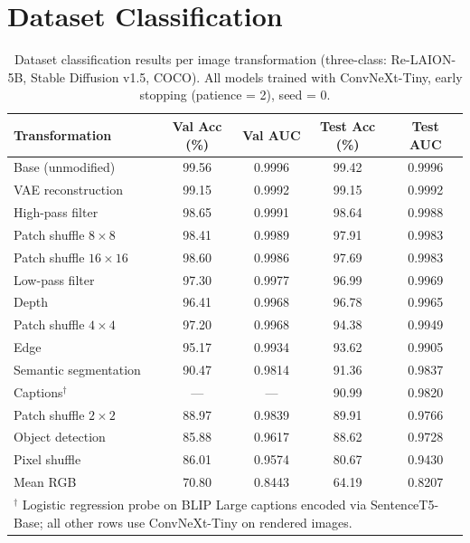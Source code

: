 \section{Dataset Classification}

\begin{table}[htbp]
	\centering
	\caption{Dataset classification results per image transformation (three-class:
		Re-LAION-5B, Stable Diffusion v1.5, COCO). All models trained with ConvNeXt-Tiny,
		early stopping (patience = 2), seed = 0.}
	\label{tab:dataset_classification_results}
	\small
	\begin{tabular}{p{4cm}cccc}
		\toprule
		\textbf{Transformation} &
		\textbf{Val Acc (\%)} & \textbf{Val AUC} &
		\textbf{Test Acc (\%)} & \textbf{Test AUC} \\
		\midrule
		Base (unmodified)          & 99.56 & 0.9996 & 99.42 & 0.9996 \\
		VAE reconstruction         & 99.15 & 0.9992 & 99.15 & 0.9992 \\
		High-pass filter           & 98.65 & 0.9991 & 98.64 & 0.9988 \\
		Patch shuffle $8\times8$   & 98.41 & 0.9989 & 97.91 & 0.9983 \\
		Patch shuffle $16\times16$ & 98.60 & 0.9986 & 97.69 & 0.9983 \\
		Low-pass filter            & 97.30 & 0.9977 & 96.99 & 0.9969 \\
		Depth                      & 96.41 & 0.9968 & 96.78 & 0.9965 \\
		Patch shuffle $4\times4$   & 97.20 & 0.9968 & 94.38 & 0.9949 \\
		Edge                       & 95.17 & 0.9934 & 93.62 & 0.9905 \\
		Semantic segmentation      & 90.47 & 0.9814 & 91.36 & 0.9837 \\
		Captions$^\dagger$         & ---   & ---    & 90.99 & 0.9820 \\
		Patch shuffle $2\times2$   & 88.97 & 0.9839 & 89.91 & 0.9766 \\
		Object detection           & 85.88 & 0.9617 & 88.62 & 0.9728 \\
		Pixel shuffle              & 86.01 & 0.9574 & 80.67 & 0.9430 \\
		Mean RGB                   & 70.80 & 0.8443 & 64.19 & 0.8207 \\
		\midrule
		\multicolumn{5}{l}{\footnotesize $^\dagger$ Logistic regression probe on BLIP Large
			captions encoded via SentenceT5-Base; all other rows use ConvNeXt-Tiny on rendered images.} \\
		\bottomrule
	\end{tabular}
\end{table}

